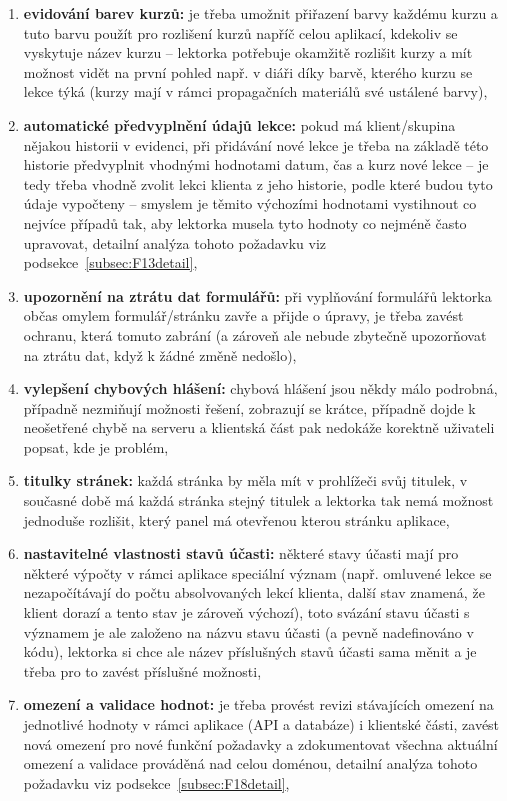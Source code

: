 \begin{enumerate}[label=\textbf{F\arabic*}]
    \item \label{F12} \textbf{evidování barev kurzů:} je třeba umožnit přiřazení barvy každému kurzu a tuto barvu použít pro rozlišení kurzů napříč celou aplikací, kdekoliv se vyskytuje název kurzu -- lektorka potřebuje okamžitě rozlišit kurzy a mít možnost vidět na první pohled např. v diáři díky barvě, kterého kurzu se lekce týká (kurzy mají v rámci propagačních materiálů své ustálené barvy),
    \item \label{F13} \textbf{automatické předvyplnění údajů lekce:} pokud má klient/skupina nějakou historii v evidenci, při přidávání nové lekce je třeba na základě této historie předvyplnit vhodnými hodnotami datum, čas a kurz nové lekce -- je tedy třeba vhodně zvolit lekci klienta z jeho historie, podle které budou tyto údaje vypočteny  -- smyslem je těmito výchozími hodnotami vystihnout co nejvíce případů tak, aby lektorka musela tyto hodnoty co nejméně často upravovat, detailní analýza tohoto požadavku viz podsekce~\ref{subsec:F13detail},
    \item \label{F14} \textbf{upozornění na ztrátu dat formulářů:} při vyplňování formulářů lektorka občas omylem formulář/stránku zavře a přijde o úpravy, je třeba zavést ochranu, která tomuto zabrání (a zároveň ale nebude zbytečně upozorňovat na ztrátu dat, když k žádné změně nedošlo),
    \item \label{F15} \textbf{vylepšení chybových hlášení:} chybová hlášení jsou někdy málo podrobná, případně nezmiňují možnosti řešení, zobrazují se krátce, případně dojde k neošetřené chybě na serveru a klientská část pak nedokáže korektně uživateli popsat, kde je problém,
    \item \label{F16} \textbf{titulky stránek:} každá stránka by měla mít v prohlížeči svůj titulek, v současné době má každá stránka stejný titulek a lektorka tak nemá možnost jednoduše rozlišit, který panel má otevřenou kterou stránku aplikace,
    \item \label{F17} \textbf{nastavitelné vlastnosti stavů účasti:} některé stavy účasti mají pro některé výpočty v rámci aplikace speciální význam (např. omluvené lekce se nezapočítávají do počtu absolvovaných lekcí klienta, další stav znamená, že klient dorazí a tento stav je zároveň výchozí), toto svázání stavu účasti s významem je ale založeno na názvu stavu účasti (a pevně nadefinováno v kódu), lektorka si chce ale název příslušných stavů účasti sama měnit a je třeba pro to zavést příslušné možnosti,
    \item \label{F18} \textbf{omezení a validace hodnot:} je třeba provést revizi stávajících omezení na jednotlivé hodnoty v rámci aplikace (API a databáze) i klientské části, zavést nová omezení pro nové funkční požadavky a zdokumentovat všechna aktuální omezení a validace prováděná nad celou doménou, detailní analýza tohoto požadavku viz podsekce~\ref{subsec:F18detail},

\end{enumerate}
